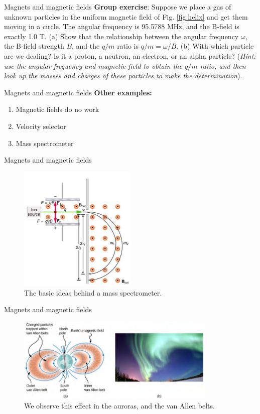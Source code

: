 \documentclass{beamer}
\begin{document}
\begin{frame}{Magnets and magnetic fields}
\textbf{Group exercise}: Suppose we place a gas of unknown particles in the uniform magnetic field of Fig. \ref{fig:helix} and get them moving in a circle.  The angular frequency is 95.5788 MHz, and the B-field is exactly 1.0 T.  (a) Show that the relationship between the angular frequency $\omega$, the B-field strength $B$, and the $q/m$ ratio is $q/m = \omega/B$. (b) With which particle are we dealing?  Is it a proton, a neutron, an electron, or an alpha particle? (\textit{Hint: use the angular frequency and magnetic field to obtain the $q/m$ ratio, and then look up the masses and charges of these particles to make the determination}).
\end{frame}

\begin{frame}{Magnets and magnetic fields}
\textbf{Other examples:}
\begin{enumerate}
\item Magnetic fields do no work
\item Velocity selector
\item Mass spectrometer
\end{enumerate}
\end{frame}

\begin{frame}{Magnets and magnetic fields}
\begin{figure}
\centering
\includegraphics[width=0.5\textwidth]{figures/massspec.png}
\caption{\label{fig:massspec} The basic ideas behind a mass spectrometer.}
\end{figure}
\end{frame}

\begin{frame}{Magnets and magnetic fields}
\begin{figure}
\centering
\includegraphics[width=0.85\textwidth]{figures/borealis.png}
\caption{\label{fig:borealis} We observe this effect in the auroras, and the van Allen belts.}
\end{figure}
\end{frame}
\end{document}
